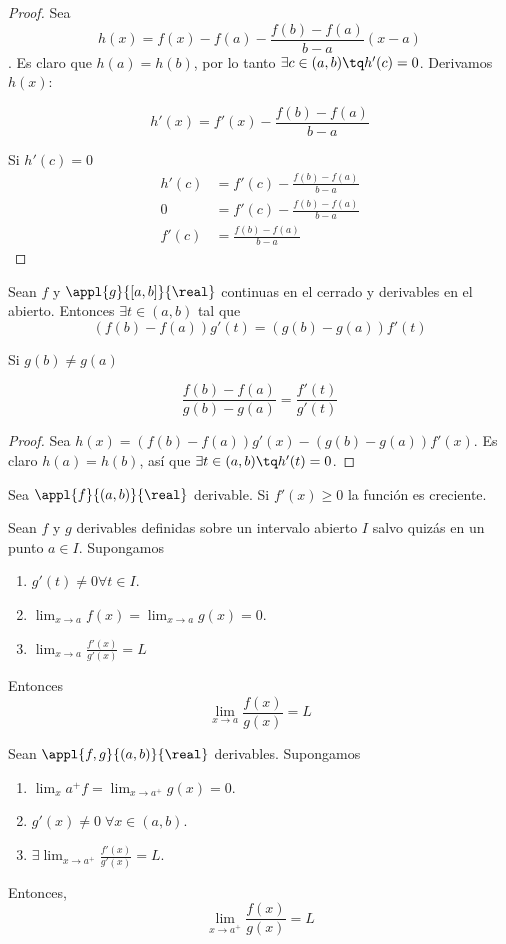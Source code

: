 \documentclass[nochap]{apuntes}
\begin{document}
\begin{proof}
Sea \[h(x)=f(x) - f(a)-\frac{f(b)-f(a)}{b-a}(x-a)\]. Es claro que $h(a)=h(b)$, por lo tanto $\exists c \in (a,b) \tq h'(c)=0$. Derivamos $h(x)$:

\[ h'(x)=f'(x) - \frac{f(b)-f(a)}{b-a} \]

Si $h'(c)=0$
\begin{align*}
h'(c)&=f'(c)-\frac{f(b)-f(a)}{b-a} \\
0 &= f'(c)-\frac{f(b)-f(a)}{b-a} \\
f'(c)&=\frac{f(b)-f(a)}{b-a}
\end{align*}
\end{proof}

\begin{theorem}
Sean $f$ y $\appl{g}{[a,b]}{\real}$ continuas en el cerrado y derivables en el abierto. Entonces $\exists t \in (a,b)$ tal que
\[ \left(f(b)-f(a)\right)g'(t)=\left(g(b)-g(a)\right)f'(t) \]

Si $g(b)\neq g(a)$

\[ \frac{f(b)-f(a)}{g(b)-g(a)}=\frac{f'(t)}{g'(t)} \]

\end{theorem}

\begin{proof}
Sea $h(x)=\left(f(b)-f(a)\right)g'(x)-\left(g(b)-g(a)\right)f'(x)$. Es claro $h(a)=h(b)$, así que $\exists t \in (a,b) \tq h'(t)=0$.
\end{proof}

\begin{lemma}
Sea $\appl{f}{(a,b)}{\real}$ derivable. Si $f'(x)\geq 0$ la función es creciente.
\end{lemma}

\begin{theorem}
Sean $f$ y $g$ derivables definidas sobre un intervalo abierto $I$ salvo quizás en un punto $a\in I$. Supongamos \begin{enumerate}
\item $g'(t)\neq 0 \forall t \in I$.
\item $\lim_{x\to a}f(x)=\lim_{x\to a}g(x)=0$.
\item $\lim_{x\to a}\frac{f'(x)}{g'(x)}=L$
\end{enumerate}

Entonces \[ \lim_{x\to a}\frac{f(x)}{g(x)}=L \]
\end{theorem}

\begin{lemma}
Sean $\appl{f,g}{(a,b)}{\real}$ derivables. Supongamos \begin{enumerate}
\item $\lim_{x}{a^+}{f}=\lim_{x\to a^+}g(x)=0$.
\item $g'(x)\neq 0 \; \forall x \in (a,b)$.
\item $\exists\lim_{x\to a^+}\frac{f'(x)}{g'(x)}=L$.
\end{enumerate}

Entonces, \[ \lim_{x\to a^+}\frac{f(x)}{g(x)}=L \]
\end{lemma}
\end{document}
